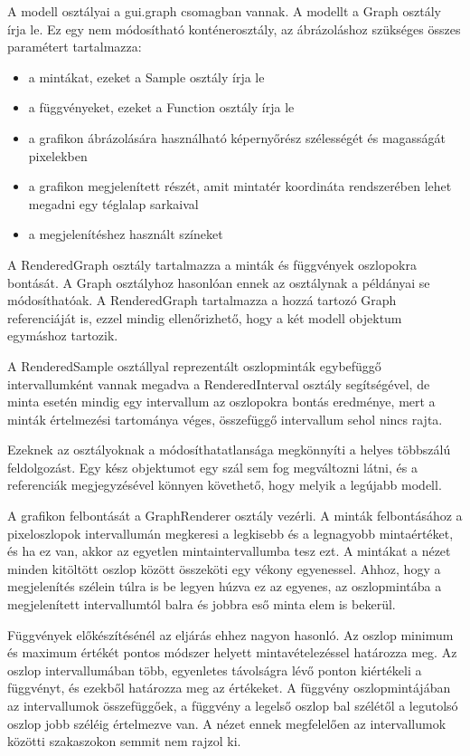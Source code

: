 A modell osztályai a gui.graph csomagban vannak.
A modellt a Graph osztály írja le. Ez egy nem módosítható konténerosztály, az ábrázoláshoz szükséges összes paramétert tartalmazza:
\begin{itemize}
\item a mintákat, ezeket a Sample osztály írja le
\item a függvényeket, ezeket a Function osztály írja le
\item a grafikon ábrázolására használható képernyőrész szélességét és magasságát pixelekben
\item a grafikon megjelenített részét, amit mintatér koordináta rendszerében lehet megadni egy téglalap sarkaival
\item a megjelenítéshez használt színeket
\end{itemize}

A RenderedGraph osztály tartalmazza a minták és függvények oszlopokra bontását. A Graph osztályhoz hasonlóan ennek az osztálynak a példányai se módosíthatóak. A RenderedGraph tartalmazza a hozzá tartozó Graph referenciáját is, ezzel mindig ellenőrizhető, hogy a két modell objektum egymáshoz tartozik.

A RenderedSample osztállyal reprezentált oszlopminták egybefüggő intervallumként vannak megadva a RenderedInterval osztály segítségével, de minta esetén mindig egy intervallum az oszlopokra bontás eredménye, mert a minták értelmezési tartománya véges, összefüggő intervallum sehol nincs rajta.

Ezeknek az osztályoknak a módosíthatatlansága megkönnyíti a helyes többszálú feldolgozást. Egy kész objektumot egy szál sem fog megváltozni látni, és a referenciák megjegyzésével könnyen követhető, hogy melyik a legújabb modell.

A grafikon felbontását a GraphRenderer osztály vezérli. A minták felbontásához a pixeloszlopok intervallumán megkeresi a legkisebb és a legnagyobb mintaértéket, és ha ez van, akkor az egyetlen mintaintervallumba tesz ezt. A mintákat a nézet minden kitöltött oszlop között összeköti egy vékony egyenessel. Ahhoz, hogy a megjelenítés szélein túlra is be legyen húzva ez az egyenes, az oszlopmintába a megjelenített intervallumtól balra és jobbra eső minta elem is bekerül.

Függvények előkészítésénél az eljárás ehhez nagyon hasonló.
Az oszlop minimum és maximum értékét pontos módszer helyett mintavételezéssel határozza meg. Az oszlop intervallumában több, egyenletes távolságra lévő ponton kiértékeli a függvényt, és ezekből határozza meg az értékeket.
A függvény oszlopmintájában az intervallumok összefüggőek, a függvény a legelső oszlop bal szélétől a legutolsó oszlop jobb széléig értelmezve van. A nézet ennek megfelelően az intervallumok közötti szakaszokon semmit nem rajzol ki.

